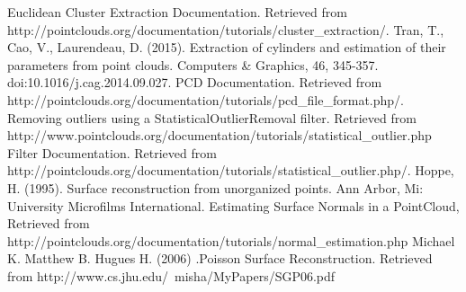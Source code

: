 \documentclass[runningheads,a4paper]{llncs}
\begin{document}
\begin{thebibliography}{4}
Euclidean Cluster Extraction Documentation. Retrieved from http://pointclouds.org/documentation/tutorials/cluster\_extraction/.
Tran, T., Cao, V., Laurendeau, D. (2015). Extraction of cylinders and estimation of their parameters from point clouds. Computers \& Graphics, 46, 345-357. doi:10.1016/j.cag.2014.09.027.
PCD Documentation. Retrieved from http://pointclouds.org/documentation/tutorials/pcd\_file\_format.php/.
 Removing outliers using a StatisticalOutlierRemoval filter. Retrieved from http://www.pointclouds.org/documentation/tutorials/statistical\_outlier.php
Filter Documentation. Retrieved from http://pointclouds.org/documentation/tutorials/statistical\_outlier.php/.
Hoppe, H. (1995). Surface reconstruction from unorganized points. Ann Arbor, Mi: University Microfilms International.
Estimating Surface Normals in a PointCloud, Retrieved from http://pointclouds.org/documentation/tutorials/normal\_estimation.php
Michael K. Matthew B. Hugues H. (2006) .Poisson Surface Reconstruction. Retrieved from http://www.cs.jhu.edu/~misha/MyPapers/SGP06.pdf
\end{thebibliography}



\end{document}
